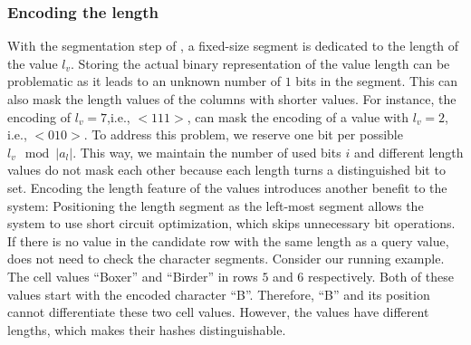 \subsubsection{Encoding the length}\label{subsub_length}
With the segmentation step of \hash, a fixed-size segment is dedicated to the length of the value $l_v$.
Storing the actual binary representation of the value length can be problematic as it leads to an unknown number of $1$ bits in the segment. This can also mask the length values of the columns with shorter values. For instance, the encoding of $l_v=7$,i.e., $<111>$, can mask the encoding of a value with $l_v=2$, i.e., $<010>$.
To address this problem, we reserve one bit per possible $l_v\mod |a_l|$. This way, we maintain the number of used bits $i$ and different length values do not mask each other because each length turns a distinguished bit to set.
Encoding the length feature of the values introduces another benefit to the system:
Positioning the length segment as the left-most segment allows the system to use short circuit optimization, which skips unnecessary bit operations.
If there is no value in the candidate row with the same length as a query value, \system does not need to check the character segments.
Consider our running example. The cell values ``Boxer'' and ``Birder'' in rows $5$ and $6$ respectively. Both of these values start with the encoded character ``B''. Therefore, ``B'' and its position cannot differentiate these two cell values. However, the values have different lengths, which makes their hashes distinguishable.


